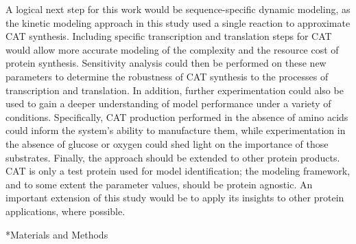 \documentclass[12pt]{article}
\makeatletter
\renewcommand\section{\@startsection
	{subsection}{2}{0mm}
	{-0.2in}
	{0.05\baselineskip}
	{\normalfont\large\bfseries}}
\makeatother
\begin{document}
A logical next step for this work would be sequence-specific dynamic modeling, as the kinetic modeling approach in this study used a single reaction to approximate CAT synthesis.
Including specific transcription and translation steps for CAT would allow more accurate modeling of the complexity and the resource cost of protein synthesis.
Sensitivity analysis could then be performed on these new parameters to determine the robustness of CAT synthesis to the processes of transcription and translation.
In addition, further experimentation could also be used to gain a deeper understanding of model performance under a variety of conditions.
Specifically, CAT production performed in the absence of amino acids could inform the system's ability to manufacture them, while experimentation in the absence of glucose or oxygen could shed light on the importance of those substrates.
Finally, the approach should be extended to other protein products.
CAT is only a test protein used for model identification; the modeling framework, and to some extent the parameter values, should be protein agnostic.
An important extension of this study would be to apply its insights to other protein applications, where possible.

\clearpage

\section*{Materials and Methods}
\end{document}
